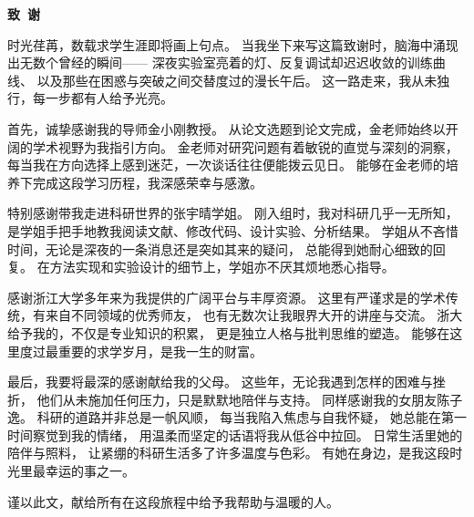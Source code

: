 \cleardoublepage{}
\begin{center}
    \bfseries {} 致~谢
\end{center}

时光荏苒，数载求学生涯即将画上句点。
当我坐下来写这篇致谢时，脑海中涌现出无数个曾经的瞬间——
深夜实验室亮着的灯、反复调试却迟迟收敛的训练曲线、
以及那些在困惑与突破之间交替度过的漫长午后。
这一路走来，我从未独行，每一步都有人给予光亮。

首先，诚挚感谢我的导师金小刚教授。
从论文选题到论文完成，金老师始终以开阔的学术视野为我指引方向。
金老师对研究问题有着敏锐的直觉与深刻的洞察，
每当我在方向选择上感到迷茫，一次谈话往往便能拨云见日。
能够在金老师的培养下完成这段学习历程，我深感荣幸与感激。

特别感谢带我走进科研世界的张宇晴学姐。
刚入组时，我对科研几乎一无所知，
是学姐手把手地教我阅读文献、修改代码、设计实验、分析结果。
学姐从不吝惜时间，无论是深夜的一条消息还是突如其来的疑问，
总能得到她耐心细致的回复。
在方法实现和实验设计的细节上，学姐亦不厌其烦地悉心指导。

感谢浙江大学多年来为我提供的广阔平台与丰厚资源。
这里有严谨求是的学术传统，有来自不同领域的优秀师友，
也有无数次让我眼界大开的讲座与交流。
浙大给予我的，不仅是专业知识的积累，
更是独立人格与批判思维的塑造。
能够在这里度过最重要的求学岁月，是我一生的财富。

最后，我要将最深的感谢献给我的父母。
这些年，无论我遇到怎样的困难与挫折，
他们从未施加任何压力，只是默默地陪伴与支持。
同样感谢我的女朋友陈子逸。
科研的道路并非总是一帆风顺，
每当我陷入焦虑与自我怀疑，
她总能在第一时间察觉到我的情绪，
用温柔而坚定的话语将我从低谷中拉回。
日常生活里她的陪伴与照料，
让紧绷的科研生活多了许多温度与色彩。
有她在身边，是我这段时光里最幸运的事之一。

谨以此文，献给所有在这段旅程中给予我帮助与温暖的人。